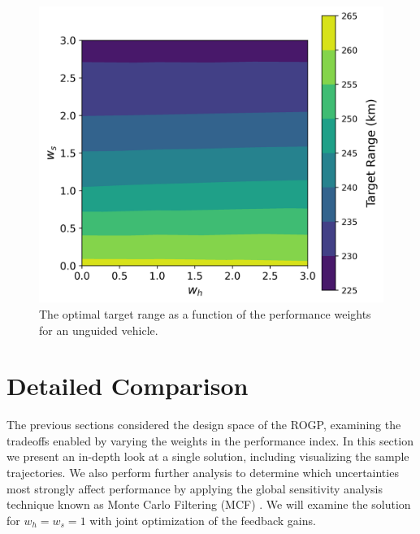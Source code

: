 \begin{figure}[h!]
	\centering
	\includegraphics[width=1\textwidth]{Images/OpenLoop_TargetRange}
	\caption{The optimal target range as a function of the performance weights for an unguided vehicle.}
	\label{Fig:MCTargetRangeOpenLoop}
\end{figure}

\section{Detailed Comparison}
The previous sections considered the design space of the ROGP, examining the tradeoffs enabled by varying the weights in the performance index. In this section we present an in-depth look at a single solution, including visualizing the sample trajectories. We also perform further analysis to determine which uncertainties most strongly affect performance by applying the global sensitivity analysis technique known as Monte Carlo Filtering (MCF) \cite{MonteCarloFiltering}. We will examine the solution for $w_h=w_s=1$ with joint optimization of the feedback gains. 

